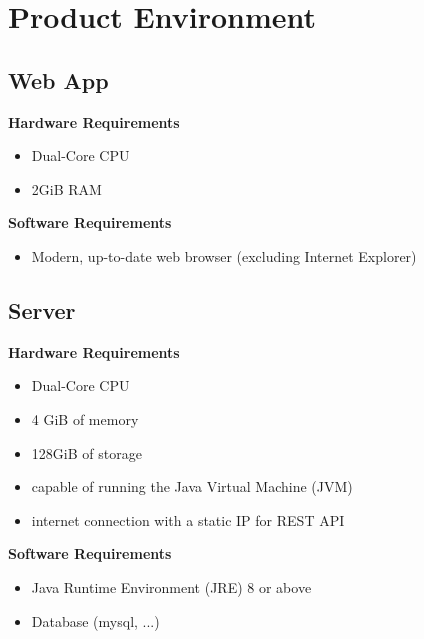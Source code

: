 \section{Product Environment}

\subsection{Web App}
\textbf{Hardware Requirements}
\begin{itemize}
    \item Dual-Core CPU
    \item 2GiB RAM
\end{itemize}

\textbf{Software Requirements}
\begin{itemize}
    \item Modern, up-to-date web browser (excluding Internet Explorer)
\end{itemize}

\subsection{Server}
\textbf{Hardware Requirements}
\begin{itemize}
    \item Dual-Core CPU
    \item 4 GiB of memory
    \item 128GiB of storage
    \item capable of running the Java Virtual Machine (JVM)
    \item internet connection with a static IP for REST API
\end{itemize}
\textbf{Software Requirements}
\begin{itemize}
    \item Java Runtime Environment (JRE) 8 or above
    \item Database (mysql, ...)
\end{itemize}